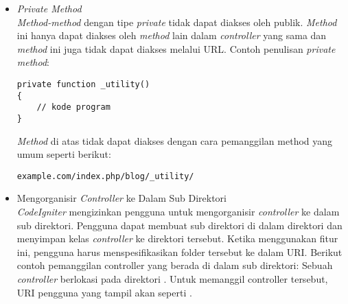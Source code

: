 \begin{itemize}
		
		\item \textit{Private Method}\\
		\textit{Method-method} dengan tipe \textit{private} tidak dapat diakses oleh publik. \textit{Method} ini hanya dapat diakses oleh \textit{method} lain dalam \textit{controller} yang sama dan \textit{method} ini juga tidak dapat diakses melalui URL. Contoh penulisan \textit{private method}:
		\begin{lstlisting}[basicstyle=\ttfamily, frame=single,
columns=fullflexible, keepspaces=true, breaklines=true]
private function _utility()
{
	// kode program
}
\end{lstlisting}
		
		\textit{Method} di atas tidak dapat diakses dengan cara pemanggilan method yang umum seperti berikut:
		\begin{lstlisting}[basicstyle=\ttfamily, frame=single,
columns=fullflexible, keepspaces=true, breaklines=true]
example.com/index.php/blog/_utility/
\end{lstlisting}
		
		\item Mengorganisir \textit{Controller} ke Dalam Sub Direktori \\
		\textit{CodeIgniter} mengizinkan pengguna untuk mengorganisir \textit{controller} ke dalam sub direktori. Pengguna dapat membuat sub direktori di dalam direktori  dan menyimpan kelas \textit{controller} ke direktori tersebut. Ketika menggunakan fitur ini, pengguna harus menspesifikasikan folder tersebut ke dalam URI. Berikut contoh pemanggilan controller yang berada di dalam sub direktori:
		Sebuah \textit{controller} berlokasi pada direktori . Untuk memanggil controller tersebut, URI pengguna yang tampil akan seperti .
	\end{itemize}

